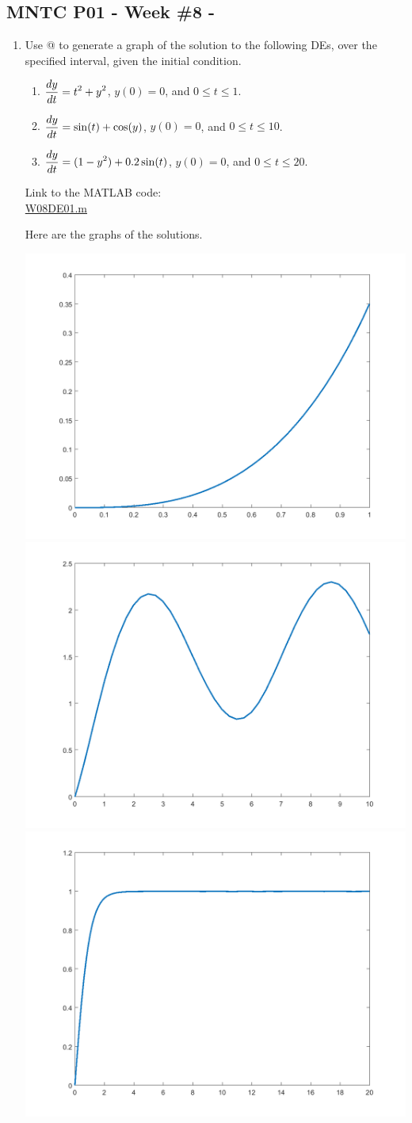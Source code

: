 




\begin{center}
\subsection*{MNTC P01 - Week \#8 - \WeekTitleEight}
\end{center}

\newcommand{\Fext}{  F_{\mbox{ext}} }
\newcommand{\Fspring}{  F_{\mbox{spring}} }

\begin{enumerate}

\item 
  \begin{Question}
    Use @ to generate a graph of the solution to the
    following DEs, over the specified interval, given the initial
    condition.

\begin{enumerate}
\item $\displaystyle \frac{dy}{dt} = t^2 + y^2$, $y(0) = 0$, and $0 \le t \le 1$.
\item $\displaystyle \frac{dy}{dt} = \sin(t) + \cos(y)$, $y(0) = 0$, and $0 \le t \le 10$.
\item $\displaystyle \frac{dy}{dt} = (1-y^2) + 0.2 \sin(t)$, $y(0) = 0$, and $0 \le t \le 20$.
\end{enumerate}
\end{Question}

\begin{Solution}
Link to the MATLAB code: \\
\href{http://www.mast.queensu.ca/~apsc171/MNTCP01/PracticeProblems/MATLAB/W08DE01.m}{W08DE01.m}

Here are the graphs of the solutions.

\includegraphics[width = 0.3\linewidth]{graphics/Week08_DESolutions/W08DE01_a} 
\includegraphics[width = 0.3\linewidth]{graphics/Week08_DESolutions/W08DE01_b} 
\includegraphics[width = 0.3\linewidth]{graphics/Week08_DESolutions/W08DE01_c} 


\end{Solution}
\end{enumerate}

